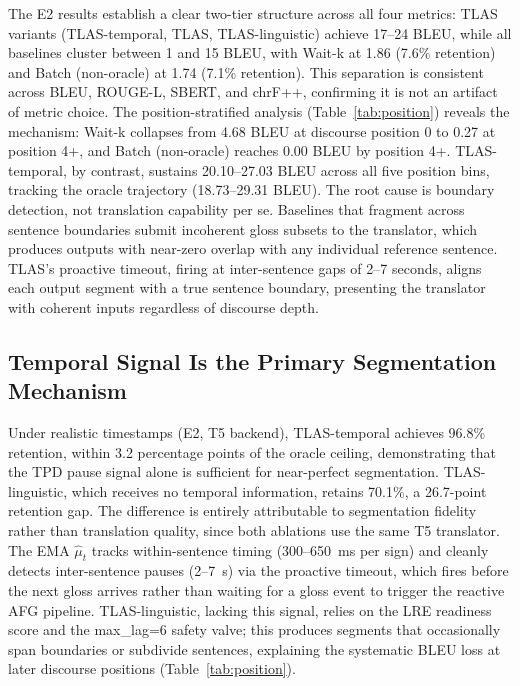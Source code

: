 \documentclass[conference]{IEEEtran}
\begin{document}
The E2 results establish a clear two-tier structure across all four metrics: TLAS variants (TLAS-temporal, TLAS, TLAS-linguistic) achieve 17--24 BLEU, while all baselines cluster between 1 and 15 BLEU, with Wait-k at 1.86 (7.6\% retention) and Batch (non-oracle) at 1.74 (7.1\% retention). This separation is consistent across BLEU, ROUGE-L, SBERT, and chrF++, confirming it is not an artifact of metric choice. The position-stratified analysis (Table~\ref{tab:position}) reveals the mechanism: Wait-k collapses from 4.68 BLEU at discourse position 0 to 0.27 at position 4+, and Batch (non-oracle) reaches 0.00 BLEU by position 4+. TLAS-temporal, by contrast, sustains 20.10--27.03 BLEU across all five position bins, tracking the oracle trajectory (18.73--29.31 BLEU). The root cause is boundary detection, not translation capability per se. Baselines that fragment across sentence boundaries submit incoherent gloss subsets to the translator, which produces outputs with near-zero overlap with any individual reference sentence. TLAS's proactive timeout, firing at inter-sentence gaps of 2--7 seconds, aligns each output segment with a true sentence boundary, presenting the translator with coherent inputs regardless of discourse depth.

\subsection{Temporal Signal Is the Primary Segmentation Mechanism}

Under realistic timestamps (E2, T5 backend), TLAS-temporal achieves 96.8\% retention, within 3.2 percentage points of the oracle ceiling, demonstrating that the TPD pause signal alone is sufficient for near-perfect segmentation. TLAS-linguistic, which receives no temporal information, retains 70.1\%, a 26.7-point retention gap. The difference is entirely attributable to segmentation fidelity rather than translation quality, since both ablations use the same T5 translator. The EMA $\hat{\mu}_t$ tracks within-sentence timing (300--650~ms per sign) and cleanly detects inter-sentence pauses (2--7~s) via the proactive timeout, which fires before the next gloss arrives rather than waiting for a gloss event to trigger the reactive AFG pipeline. TLAS-linguistic, lacking this signal, relies on the LRE readiness score and the max\_lag=$6$ safety valve; this produces segments that occasionally span boundaries or subdivide sentences, explaining the systematic BLEU loss at later discourse positions (Table~\ref{tab:position}).
\end{document}
